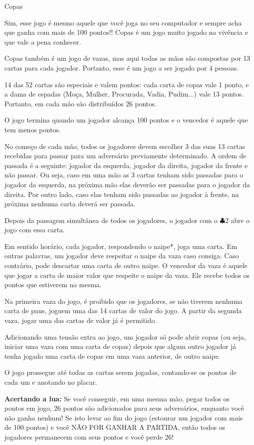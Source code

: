 \begin{subsecao}{Copas}

Sim, esse jogo é mesmo aquele que você joga no seu computador e sempre acha que
ganha com mais de 100 pontos!! Copas é um jogo muito jogado na vivência e que
vale a pena conhecer.

Copas também é um jogo de vazas, mas aqui todas as mãos são compostas por 13
cartas para cada jogador. Portanto, esse é um jogo a ser jogado por 4 pessoas.

14 das 52 cartas são especiais e valem pontos: cada carta de copas vale 1
ponto, e a dama de espadas (Moça, Mulher, Procurada, Vadia, Pudim...) vale 13
pontos. Portanto, em cada mão são distribuídos 26 pontos.

O jogo termina quando um jogador alcança 100 pontos e o vencedor é aquele que
tem menos pontos.

No começo de cada mão, todos os jogadores devem escolher 3 das suas 13 cartas
recebidas para passar para um adversário previamente determinado. A ordem de
passada é a seguinte: jogador da esquerda, jogador da direita, jogador da
frente e não passar. Ou seja, caso em uma mão as 3 cartas tenham sido passadas
para o jogador da esquerda, na próxima mão elas deverão ser passadas para o
jogador da direita. Por outro lado, caso elas tenham sido passadas ao jogador
à frente, na próxima nenhuma carta deverá ser passada.

Depois da passagem simultânea de todos os jogadores, o jogador com
o $\clubsuit$2 abre o jogo com essa carta.

Em sentido horário, cada jogador, respondendo o naipe*, joga uma carta. Em
outras palavras, um jogador deve respeitar o naipe da vaza caso consiga. Caso
contrário, pode descartar uma carta de outro naipe. O vencedor da vaza é aquele
que jogar a carta de maior valor que respeite o naipe da vaza. Ele recebe todos
os pontos que estiverem na mesma.

Na primeira vaza do jogo, é proibido que os jogadores, se não tiverem nenhuma
carta de paus, joguem uma das 14 cartas de valor do jogo. A partir da segunda
vaza, jogar uma das cartas de valor já é permitido.

Adicionando uma tensão extra ao jogo, um jogador só pode abrir copas (ou seja,
iniciar uma vaza com uma carta de copas) depois que algum outro jogador já
tenha jogado uma carta de copas em uma vaza anterior, de outro naipe.

O jogo prossegue até todas as cartas serem jogadas, contando-se os pontos de
cada um e anotando no placar.

\textbf{Acertando a lua:} Se você conseguir, em uma mesma mão, pegar todos os
pontos em jogo, 26 pontos são adicionados para seus adversários, enquanto você
não ganha nenhum! Se isto levar ao fim do jogo (estourar um jogador com mais
de 100 pontos) e você NÃO FOR GANHAR A PARTIDA, então todos os jogadores
permanecem com seus pontos e você perde 26!

\end{subsecao}
